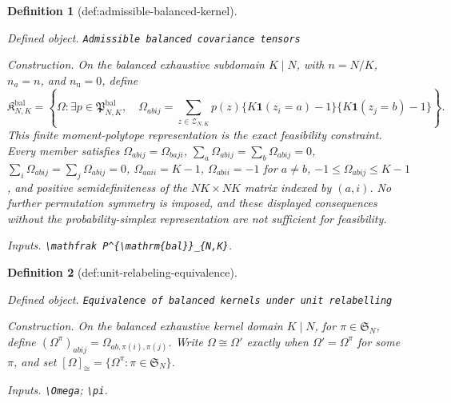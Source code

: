 \documentclass{article}
\newtheorem{definition}{Definition}
\begin{document}
\begin{definition}[def:admissible-balanced-kernel]\label{def:admissible-balanced-kernel}
\par\smallskip\noindent\emph{Defined object.} \texttt{Admissible balanced covariance tensors}
\par\smallskip\noindent\emph{Construction.} On the balanced exhaustive subdomain \(K\mid N\), with \(n=N/K\), \(n_a=n\), and \(n_{\mathrm u}=0\), define
\[
\mathfrak K^{\mathrm{bal}}_{N,K}=\left\{\Omega:\exists p\in\mathfrak P^{\mathrm{bal}}_{N,K},\quad \Omega_{abij}=\sum_{z\in\mathcal Z_{N,K}}p(z)\{K\mathbf 1(z_i=a)-1\}\{K\mathbf 1(z_j=b)-1\}\right\}.
\]
This finite moment-polytope representation is the exact feasibility constraint. Every member satisfies \(\Omega_{abij}=\Omega_{baji}\), \(\sum_a\Omega_{abij}=\sum_b\Omega_{abij}=0\), \(\sum_i\Omega_{abij}=\sum_j\Omega_{abij}=0\), \(\Omega_{aaii}=K-1\), \(\Omega_{abii}=-1\) for \(a\ne b\), \(-1\leq\Omega_{abij}\leq K-1\), and positive semidefiniteness of the \(NK\times NK\) matrix indexed by \((a,i)\). No further permutation symmetry is imposed, and these displayed consequences without the probability-simplex representation are not sufficient for feasibility.
\par\smallskip\noindent\emph{Inputs.} \texttt{\textbackslash{}\allowbreak{}mathfrak P\textasciicircum{}\{\textbackslash{}\allowbreak{}mathrm\{bal\}\allowbreak{}\}\allowbreak{}\_\allowbreak{}\{N,\allowbreak{}K\}\allowbreak{}}.
\end{definition}

\begin{definition}[def:unit-relabeling-equivalence]\label{def:unit-relabeling-equivalence}
\par\smallskip\noindent\emph{Defined object.} \texttt{Equivalence of balanced kernels under unit relabelling}
\par\smallskip\noindent\emph{Construction.} On the balanced exhaustive kernel domain \(K\mid N\), for \(\pi\in\mathfrak S_N\), define \((\Omega^{\pi})_{abij}=\Omega_{ab,\pi(i),\pi(j)}\). Write \(\Omega\cong\Omega'\) exactly when \(\Omega'=\Omega^{\pi}\) for some \(\pi\), and set \([\Omega]_{\cong}=\{\Omega^{\pi}:\pi\in\mathfrak S_N\}\).
\par\smallskip\noindent\emph{Inputs.} \texttt{\textbackslash{}\allowbreak{}Omega}; \texttt{\textbackslash{}\allowbreak{}pi}.
\end{definition}
\end{document}
